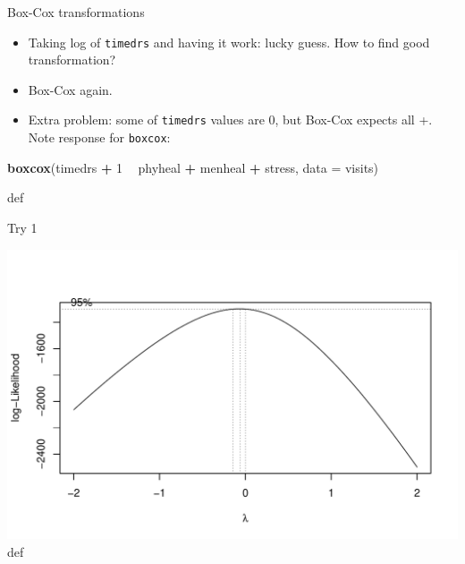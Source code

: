\documentclass[ignorenonframetext,]{beamer}
\newenvironment{Shaded}{\begin{snugshade}}{\end{snugshade}}
\newcommand{\DataTypeTok}[1]{\textcolor[rgb]{0.13,0.29,0.53}{#1}}
\newcommand{\DecValTok}[1]{\textcolor[rgb]{0.00,0.00,0.81}{#1}}
\newcommand{\KeywordTok}[1]{\textcolor[rgb]{0.13,0.29,0.53}{\textbf{#1}}}
\newcommand{\NormalTok}[1]{#1}
\newcommand{\OperatorTok}[1]{\textcolor[rgb]{0.81,0.36,0.00}{\textbf{#1}}}
\newcommand{\StringTok}[1]{\textcolor[rgb]{0.31,0.60,0.02}{#1}}
\begin{document}
\begin{frame}[fragile]{Box-Cox transformations}
\protect\hypertarget{box-cox-transformations}{}

\begin{itemize}
\item
  Taking log of \texttt{timedrs} and having it work: lucky guess. How to
  find good transformation?
\item
  Box-Cox again.
\item
  Extra problem: some of \texttt{timedrs} values are 0, but Box-Cox
  expects all +. Note response for \texttt{boxcox}:
\end{itemize}

\begin{Shaded}
\begin{Highlighting}[]
\KeywordTok{boxcox}\NormalTok{(timedrs }\OperatorTok{+}\StringTok{ }\DecValTok{1} \OperatorTok{~}\StringTok{ }\NormalTok{phyheal }\OperatorTok{+}\StringTok{ }\NormalTok{menheal }\OperatorTok{+}\StringTok{ }\NormalTok{stress, }\DataTypeTok{data =}\NormalTok{ visits)}
\end{Highlighting}
\end{Shaded}

def

\end{frame}

\begin{frame}{Try 1}
\protect\hypertarget{try-1}{}

\includegraphics{figure/unnamed-chunk-40-1.pdf} def

\end{frame}
\end{document}
